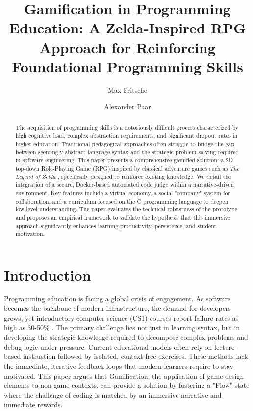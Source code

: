\documentclass[a4paper, UKenglish, cleveref, autoref, thm-restate]{oasics-v2021}
\title{Gamification in Programming Education: A Zelda-Inspired RPG Approach for Reinforcing Foundational Programming Skills}
\author{Max Fritsche}
{DHSN Duale Hochschule Sachsen, Staatliche Studienakademie Leipzig, Germany, and Security Robotics D\&S GmbH, Germany}{s5002242@edu.dhsn.de}{}{}
\author{Alexander Paar}{DHSN Duale Hochschule Sachsen, Staatliche Studienakademie Leipzig, Germany}{alexander.paar@dhsn.de}{}{}
\begin{document}
\maketitle

\begin{abstract}
The acquisition of programming skills is a notoriously difficult process characterized by high cognitive load, complex abstraction requirements, and significant dropout rates in higher education. Traditional pedagogical approaches often struggle to bridge the gap between seemingly abstract language syntax and the strategic problem-solving required in software engineering. This paper presents a comprehensive gamified solution: a 2D top-down Role-Playing Game (RPG) inspired by classical adventure games such as \textit{The Legend of Zelda} \cite{nintendo1986zelda}, specifically designed to reinforce existing knowledge. We detail the integration of a secure, Docker-based automated code judge within a narrative-driven environment. Key features include a virtual economy, a social "company" system for collaboration, and a curriculum focused on the C programming language to deepen low-level understanding. The paper evaluates the technical robustness of the prototype and proposes an empirical framework to validate the hypothesis that this immersive approach significantly enhances learning productivity, persistence, and student motivation.
\end{abstract}

\section{Introduction}
Programming education is facing a global crisis of engagement. As software becomes the backbone of modern infrastructure, the demand for developers grows, yet introductory computer science (CS1) courses report failure rates as high as 30-50\% \cite{singh2022challenges,medeiros2019review}. The primary challenge lies not just in learning syntax, but in developing the strategic knowledge required to decompose complex problems and debug logic under pressure.
Current educational models often rely on lecture-based instruction followed by isolated, context-free exercises. These methods lack the immediate, iterative feedback loops that modern learners require to stay motivated. This paper argues that Gamification, the application of game design elements to non-game contexts, can provide a solution by fostering a "Flow" state where the challenge of coding is matched by an immersive narrative and immediate rewards.
\end{document}
